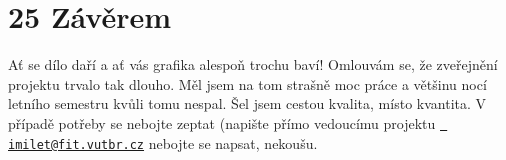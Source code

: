 \chapter{25 Závěrem}
\hypertarget{p25_zaver}{}\label{p25_zaver}
Ať se dílo daří a ať vás grafika alespoň trochu baví! Omlouvám se, že zveřejnění projektu trvalo tak dlouho. Měl jsem na tom strašně moc práce a většinu nocí letního semestru kvůli tomu nespal. Šel jsem cestou kvalita, místo kvantita. V případě potřeby se nebojte zeptat (napište přímo vedoucímu projektu \href{mailto:imilet@fit.vutbr.cz}{\texttt{ imilet@fit.\+vutbr.\+cz}} nebojte se napsat, nekoušu. 